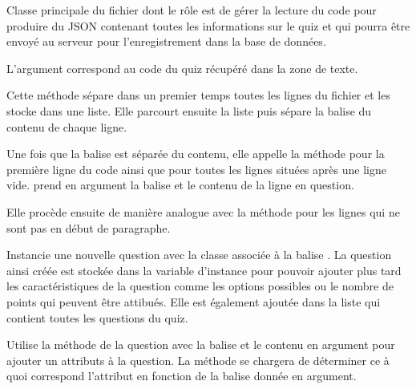 \documentclass[a4,10pt,french]{sphinxmanual}
\begin{document}
\begin{fulllineitems}
\label{front-end:Parse}
Classe principale du fichier dont le rôle est de gérer la lecture du code pour
produire du JSON contenant toutes les informations sur le quiz et qui pourra
être envoyé au serveur pour l'enregistrement dans la base de données.

L'argument  correspond au code du quiz récupéré dans la zone de texte.

\begin{fulllineitems}
\label{front-end:Parse.read}
Cette méthode sépare dans un premier temps toutes les lignes du fichier et
les stocke dans une liste. Elle parcourt ensuite la liste puis sépare
la balise du contenu de chaque ligne.

Une fois que la balise est séparée
du contenu, elle appelle la méthode  pour
la première ligne du code ainsi que pour toutes les lignes situées après
une ligne vide.  prend en argument la balise
et le contenu de la ligne en question.

Elle procède ensuite de manière analogue avec la méthode 
pour les lignes qui ne sont pas en début de paragraphe.

\end{fulllineitems}


\begin{fulllineitems}
\label{front-end:Parse.new_question}
Instancie une nouvelle question avec la classe associée à la balise .
La question ainsi créée est stockée dans la variable d'instance 
pour pouvoir ajouter plus tard les caractéristiques de la question comme
les options possibles ou le nombre de points qui peuvent être attibués.
Elle est également ajoutée dans la liste  qui contient
toutes les questions du quiz.

\end{fulllineitems}


\begin{fulllineitems}
\label{front-end:Parse.new_attribute}
Utilise la méthode  de la question 
avec la balise et le contenu en argument pour ajouter un attributs à la question.
La méthode  se chargera de déterminer ce à quoi correspond
l'attribut en fonction de la balise donnée en argument.


\end{fulllineitems}
\end{fulllineitems}
\end{document}
